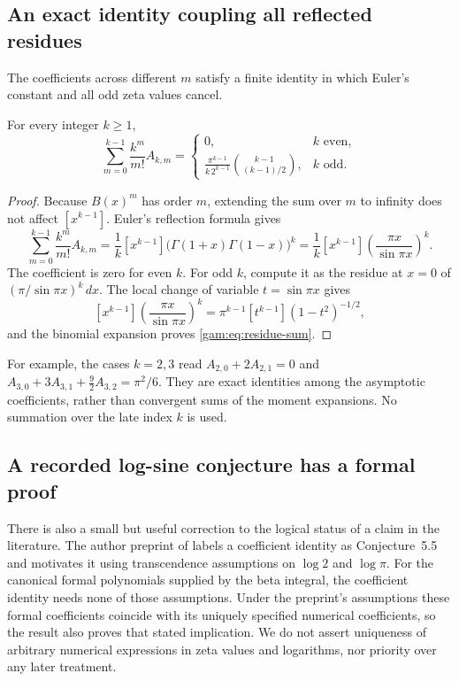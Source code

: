 \subsection{An exact identity coupling all reflected residues}

The coefficients across different $m$ satisfy a finite identity in which
Euler's constant and all odd zeta values cancel.

\begin{proposition}\label{gam:prop:residue-sum}
For every integer $k\ge1$,
\begin{equation}\label{gam:eq:residue-sum}
 \sum_{m=0}^{k-1}\frac{k^m}{m!}A_{k,m}
 =\begin{cases}
 0,&k\text{ even},\\[2pt]
 \displaystyle\frac{\pi^{k-1}}{k\,2^{k-1}}
 \binom{k-1}{(k-1)/2},&k\text{ odd}.
 \end{cases}
\end{equation}
\end{proposition}
\begin{proof}
Because $B(x)^m$ has order $m$, extending the sum over $m$ to infinity
does not affect $[x^{k-1}]$.  Euler's reflection formula gives
\[
 \sum_{m=0}^{k-1}\frac{k^m}{m!}A_{k,m}
 =\frac1k[x^{k-1}]\bigl(\Gamma(1+x)\Gamma(1-x)\bigr)^k
 =\frac1k[x^{k-1}]\left(\frac{\pi x}{\sin\pi x}\right)^k.
\]
The coefficient is zero for even $k$.  For odd $k$, compute it as
the residue at $x=0$ of $(\pi/\sin\pi x)^k\,dx$.
The local change of variable $t=\sin\pi x$ gives
\[
 [x^{k-1}]\left(\frac{\pi x}{\sin\pi x}\right)^k
 =\pi^{k-1}[t^{k-1}](1-t^2)^{-1/2},
\]
and the binomial expansion proves \eqref{gam:eq:residue-sum}.
\end{proof}

For example, the cases $k=2,3$ read
$A_{2,0}+2A_{2,1}=0$ and
$A_{3,0}+3A_{3,1}+\tfrac92 A_{3,2}=\pi^2/6$.
They are exact identities among the asymptotic coefficients, rather
than convergent sums of the moment expansions.  No summation over
the late index $k$ is used.

\subsection{A recorded log-sine conjecture has a formal proof}

There is also a small but useful correction to the logical status of
a claim in the literature.  The author preprint of \cite{ACEMKM}
labels a coefficient identity as Conjecture~5.5 and motivates it using
transcendence assumptions on $\log 2$ and $\log\pi$.
For the canonical formal polynomials supplied by the beta integral,
the coefficient identity needs none of those assumptions.  Under the
preprint's assumptions these formal coefficients coincide with its
uniquely specified numerical coefficients, so the result also proves
that stated implication.  We do not assert uniqueness of arbitrary
numerical expressions in zeta values and logarithms, nor priority over
any later treatment.

